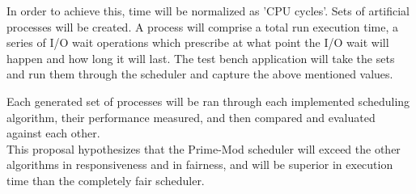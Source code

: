 \documentclass[12pt]{article}
\begin{document}
	In order to achieve this, time will be normalized as 'CPU cycles'.
	Sets of artificial processes will be created.
	A process will comprise a total run execution time, a series of I/O wait operations which prescribe at what point the I/O wait will happen and how long it will last.
	The test bench application will take the sets and run them through the scheduler and capture the above mentioned values.
	
	Each generated set of processes will be ran through each implemented scheduling algorithm, their performance measured, and then compared and evaluated against each other.\\
	
	This proposal hypothesizes that the Prime-Mod scheduler will exceed the other algorithms in responsiveness and in fairness, and will be superior in execution time than the completely fair scheduler.
	
\end{document}

